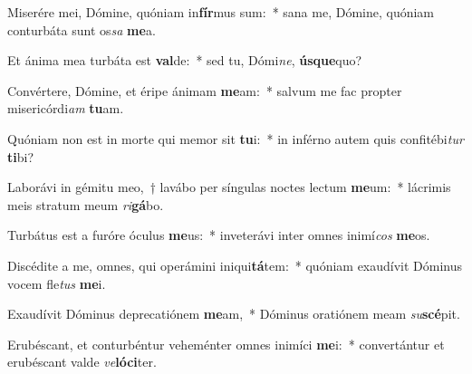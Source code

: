 \item Miserére mei, Dómine, quóniam in\textbf{fír}mus sum:~* sana me, Dómine, quóniam conturbáta sunt os\textit{sa} \textbf{me}a.
\item Et ánima mea turbáta est \textbf{val}de:~* sed tu, Dómi\textit{ne}, \textbf{ús}\textbf{que}quo?
\item Convértere, Dómine, et éripe ánimam \textbf{me}am:~* salvum me fac propter misericórdi\textit{am} \textbf{tu}am.
\item Quóniam non est in morte qui memor sit \textbf{tu}i:~* in inférno autem quis confitébi\textit{tur} \textbf{ti}bi?
\item Laborávi in gémitu meo,~† lavábo per síngulas noctes lectum \textbf{me}um:~* lácrimis meis stratum meum \textit{ri}\textbf{gá}bo.
\item Turbátus est a furóre óculus \textbf{me}us:~* inveterávi inter omnes inimí\textit{cos} \textbf{me}os.
\item Discédite a me, omnes, qui operámini iniqui\textbf{tá}tem:~* quóniam exaudívit Dóminus vocem fle\textit{tus} \textbf{me}i.
\item Exaudívit Dóminus deprecatiónem \textbf{me}am,~* Dóminus oratiónem meam \textit{su}\textbf{scé}pit.
\item Erubéscant, et conturbéntur veheménter omnes inimíci \textbf{me}i:~* convertántur et erubéscant valde \textit{ve}\textbf{ló}\textbf{ci}ter.
